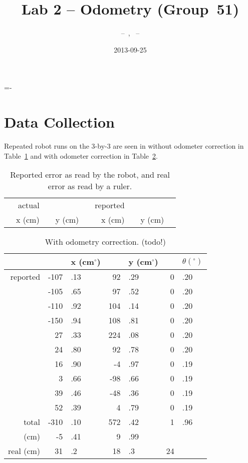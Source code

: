 \documentclass[twocolumn]{article}
\author{\bname~--~\bid, \name~--~\id}
\title{Lab 2 -- Odometry (Group~51)}
\date{2013-09-25}
\def\degree{\ensuremath{^\circ}}
\begin{document}
\abovedisplayskip=-\baselineskip

\maketitle



\section{Data Collection}

Repeated robot runs on the 3-by-3 are seen in without odometer correction in Table~\ref{a} and with odometer correction in Table~\ref{b}.

\begin{table}[htb]
\begin{center}\begin{tabular}{r r@{}l r@{}l r@{}l r@{}l}
&actual&&& &reported&&& \\
&x (cm)& &y (cm)& &x (cm)& &y (cm)& \\
\hline
\hline
\end{tabular}\end{center}
\caption{Reported error as read by the robot, and real error as read by a ruler.}
\label{a}
\end{table}

\begin{table}[htb]
\begin{center}\begin{tabular}{r r@{}l r@{}l r@{}l}
& &x (cm\degree)& &y (cm\degree)& &$\theta (\degree)$ \\
\hline
reported&-107&.13&	92&.29&	0&.20 \\
&-105&.65&	97&.52&	0&.20 \\
&-110&.92&	104&.14&	0&.20 \\
&-150&.94&	108&.81&	0&.20 \\
&27&.33&	224&.08&	0&.20 \\
&24&.80&	92&.78&	0&.20 \\
&16&.90&	-4&.97&	0&.19 \\
&3&.66&	-98&.66&	0&.19 \\
&39&.46&	-48&.36&	0&.19 \\
&52&.39&	4&.79&	0&.19 \\
\hline
total&	-310&.10&	572&.42&	1&.96 \\
(cm)&	-5&.41& 9&.99\\
real (cm)&	31&.2&	18&.3&	24
\end{tabular}\end{center}
\caption{With odometry correction. (todo!)}
\label{b}
\end{table}
\end{document}
